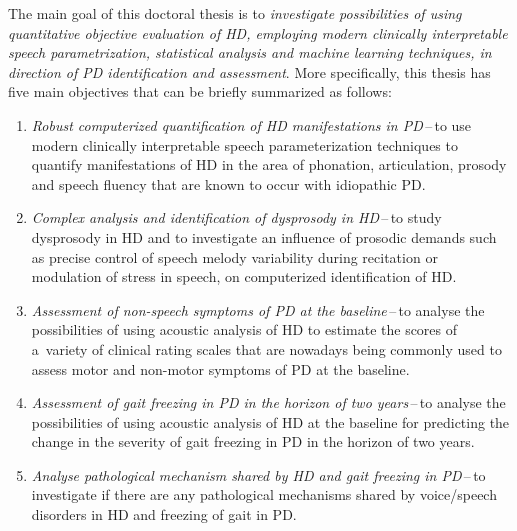 The main goal of this doctoral thesis is to \textit{investigate possibilities of using quantitative objective evaluation of HD, employing modern clinically interpretable speech parametrization, statistical analysis and machine learning techniques, in direction of PD identification and assessment}. More specifically, this thesis has five main objectives that can be briefly summarized as follows:
\begin{enumerate}
	\item \textit{Robust computerized quantification of HD manifestations in PD}\,--\,to use modern clinically interpretable speech parameterization techniques to quantify manifestations of HD in the area of phonation, articulation, prosody and speech fluency that are known to occur with idiopathic PD.
	\item \textit{Complex analysis and identification of dysprosody in HD}\,--\,to study dysprosody in HD and to investigate an influence of prosodic demands such as precise control of speech melody variability during recitation or modulation of stress in speech, on computerized identification of HD.
	\item \textit{Assessment of non-speech symptoms of PD at the baseline}\,--\,to analyse the possibilities of using acoustic analysis of HD to estimate the scores of a~variety of clinical rating scales that are nowadays being commonly used to assess motor and non-motor symptoms of PD at the baseline.
	\item \textit{Assessment of gait freezing in PD in the horizon of two years}\,--\,to analyse the possibilities of using acoustic analysis of HD at the baseline for predicting the change in the severity of gait freezing in PD in the horizon of two years. 
	\item \textit{Analyse pathological mechanism shared by HD and gait freezing in PD}\,--\,to investigate if there are any pathological mechanisms shared by voice/speech disorders in HD and freezing of gait in PD.
\end{enumerate}

